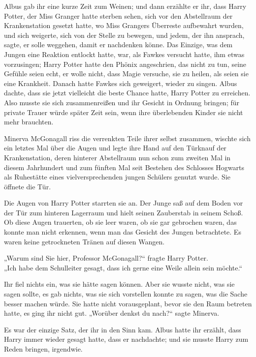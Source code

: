 {Albus gab ihr eine kurze Zeit zum Weinen; und dann erzählte er ihr, dass Harry Potter, der Miss Granger hatte sterben sehen, sich vor den Abstellraum der Krankenstation gesetzt hatte, wo Miss Grangers Überreste aufbewahrt wurden, und sich weigerte, sich von der Stelle zu bewegen, und jedem, der ihn ansprach, sagte, er solle weggehen, damit er nachdenken könne. Das Einzige, was dem Jungen eine Reaktion entlockt hatte, war, als Fawkes versucht hatte, ihm etwas vorzusingen; Harry Potter hatte den Phönix angeschrien, das nicht zu tun, seine Gefühle seien echt, er wolle nicht, dass Magie versuche, sie zu heilen, als seien sie eine Krankheit. Danach hatte Fawkes sich geweigert, wieder zu singen. Albus dachte, dass sie jetzt vielleicht die beste Chance hatte, Harry Potter zu erreichen. Also musste sie sich zusammenreißen und ihr Gesicht in Ordnung bringen; für private Trauer würde später Zeit sein, wenn ihre überlebenden Kinder sie nicht mehr brauchten.

Minerva McGonagall riss die verrenkten Teile ihrer selbst zusammen, wischte sich ein letztes Mal über die Augen und legte ihre Hand auf den Türknauf der Krankenstation, deren hinterer Abstellraum nun schon zum zweiten Mal in diesem Jahrhundert und zum fünften Mal seit Bestehen des Schlosses Hogwarts als Ruhestätte eines vielversprechenden jungen Schülers genutzt wurde. Sie öffnete die Tür.

Die Augen von Harry Potter starrten sie an. Der Junge saß auf dem Boden vor der Tür zum hinteren Lagerraum und hielt seinen Zauberstab in seinem Schoß. Ob diese Augen trauerten, ob sie leer waren, ob sie gar gebrochen waren, das konnte man nicht erkennen, wenn man das Gesicht des Jungen betrachtete. Es waren keine getrockneten Tränen auf diesen Wangen.

„Warum sind Sie hier, Professor McGonagall?“ fragte Harry Potter.\\ „Ich habe dem Schulleiter gesagt, dass ich gerne eine Weile allein sein möchte.“

Ihr fiel nichts ein, was sie hätte sagen können. Aber sie wusste nicht, was sie sagen sollte, es gab nichts, was sie sich vorstellen konnte zu sagen, was die Sache besser machen würde. Sie hatte nicht vorausgeplant, bevor sie den Raum betreten hatte, es ging ihr nicht gut. „Worüber denkst du nach?“ sagte Minerva.

Es war der einzige Satz, der ihr in den Sinn kam. Albus hatte ihr erzählt, dass Harry immer wieder gesagt hatte, dass er nachdachte; und sie musste Harry zum Reden bringen, irgendwie.

}
